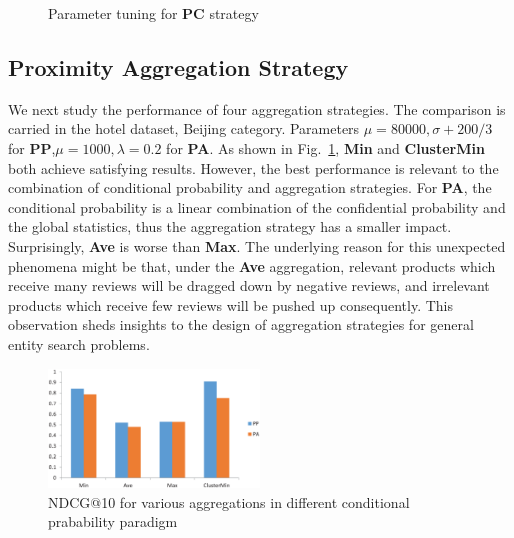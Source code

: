 \documentclass[preprint]{elsarticle}
\begin{document}
\begin{figure}
\caption{Parameter tuning for \textbf{PC} strategy}
\end{figure}

\subsection{Proximity Aggregation Strategy}
We next study the performance of four aggregation strategies. The comparison is carried in the hotel dataset, Beijing category. Parameters $\mu=80000,\sigma+200/3$ for \textbf{PP},$\mu=1000,\lambda=0.2$ for \textbf{PA}. As shown in Fig.~\ref{fig:aggregation}, \textbf{Min} and \textbf{ClusterMin} both achieve satisfying results. However, the best performance is relevant to the combination of conditional probability and aggregation strategies. For \textbf{PA}, the conditional probability is a linear combination of the confidential probability and the global statistics, thus the aggregation strategy has a smaller impact. Surprisingly, \textbf{Ave} is worse than \textbf{Max}. The underlying reason for this unexpected phenomena might be that, under the \textbf{Ave} aggregation, relevant products which receive many reviews will be dragged down by negative reviews, and irrelevant products which receive few reviews will be pushed up consequently. This observation sheds insights to the design of aggregation strategies for general entity search problems.   

\begin{figure}\label{fig:aggregation}
\includegraphics[width=0.5\textwidth]{aggregation.eps}
\caption{NDCG@10 for various aggregations in different conditional prabability paradigm}
\end{figure}
\end{document}
